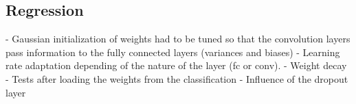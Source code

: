 \subsection{Regression}

- Gaussian initialization of weights had to be tuned so that the convolution layers pass information to the fully connected layers (variances and biases)
- Learning rate adaptation depending of the nature of the layer (fc or conv).
- Weight decay
- Tests after loading the weights from the classification
- Influence of the dropout layer
